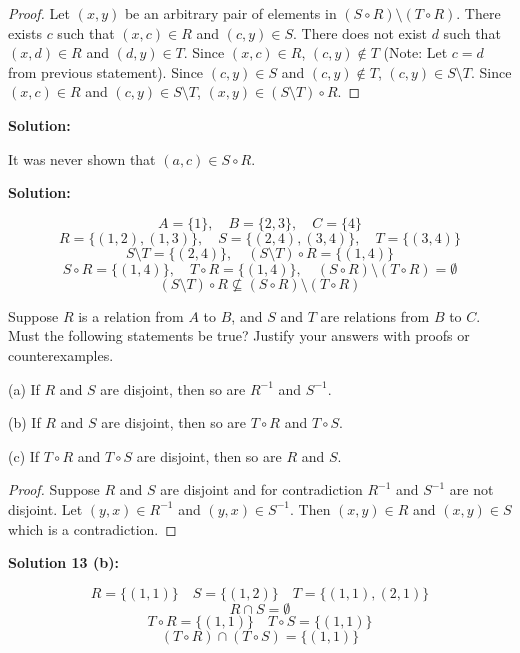\begin{proof}
    Let $(x, y)$ be an arbitrary pair of elements in $(S \circ R) \setminus (T \circ R)$.
    There exists $c$ such that $(x, c) \in R$ and $(c, y) \in S$.
    There does not exist $d$ such that $(x, d) \in R$ and $(d, y) \in T$.
    Since $(x, c) \in R$, $(c, y) \not \in T$ (Note: Let $c = d$ from previous statement).
    Since $(c, y) \in S$ and $(c, y) \not \in T$, $(c, y) \in S \setminus T$.
    Since $(x, c) \in R$ and $(c, y) \in S \setminus T$, $(x, y) \in (S \setminus T) \circ R$.
\end{proof}

\textbf{Solution:}

It was never shown that $(a, c) \in S \circ R$.

\textbf{Solution:}

\[
A = \{1\},\quad B = \{2,3\},\quad C = \{4\}
\]
\[
R = \{(1,2),(1,3)\},\quad
S = \{(2,4),(3,4)\},\quad
T = \{(3,4)\}
\]
\[
S \setminus T = \{(2,4)\},\quad
(S \setminus T) \circ R = \{(1,4)\}
\]
\[
S \circ R = \{(1,4)\},\quad
T \circ R = \{(1,4)\},\quad
(S \circ R) \setminus (T \circ R) = \emptyset
\]
\[(S \setminus T) \circ R \not\subseteq (S \circ R) \setminus (T \circ R)\]

\begin{tcolorbox}[title=Problem 13, breakable]
    Suppose $R$ is a relation from $A$ to $B$, and $S$ and $T$ are relations from $B$ to $C$.
    Must the following statements be true? Justify your answers with proofs or counterexamples.

    (a) If $R$ and $S$ are disjoint, then so are $R^{-1}$ and $S^{-1}$.

    (b) If $R$ and $S$ are disjoint, then so are $T \circ R$ and $T \circ S$.

    (c) If $T \circ R$ and $T \circ S$ are disjoint, then so are $R$ and $S$.
\end{tcolorbox}

\begin{proof}
    Suppose $R$ and $S$ are disjoint and for contradiction $R^{-1}$ and $S^{-1}$ are not disjoint.
    Let $(y, x) \in R^{-1}$ and $(y, x) \in S^{-1}$.
    Then $(x, y) \in R$ and $(x, y) \in S$ which is a contradiction.
\end{proof}

\textbf{Solution 13 (b):}

\[R = \{(1, 1)\} \quad S = \{(1, 2)\} \quad T = \{(1, 1), (2, 1)\}\]
\[R \cap S = \emptyset\]
\[T \circ R = \{(1, 1)\} \quad T \circ S = \{(1, 1)\}\]
\[(T \circ R) \cap (T \circ S) = \{(1, 1)\}\]


